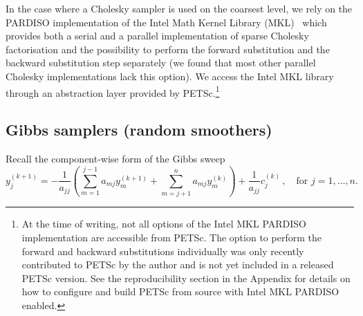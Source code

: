 \documentclass[
fontsize=11pt,
paper=a4,
numbers=noenddot
]{scrartcl}
\begin{document}
 In the case where a Cholesky sampler is used on the coarsest level, we rely on the PARDISO implementation of the Intel Math Kernel Library (MKL)~\cite{intelmkl} which provides both a serial and a parallel implementation of sparse Cholesky factorisation and the possibility to perform the forward substitution and the backward substitution step separately (we found that most other parallel Cholesky implementations lack this option). We access the Intel MKL library through an abstraction layer provided by PETSc.\footnote{At the time of writing, not all options of the Intel MKL PARDISO implementation are accessible from PETSc. The option to perform the forward and backward substitutions individually was only recently contributed to PETSc by the author and is not yet included in a released PETSc version. See the reproducibility section in the Appendix for details on how to configure and build PETSc from source with Intel MKL PARDISO enabled.} 

\subsection{Gibbs samplers (random smoothers)}

Recall the component-wise form of the Gibbs sweep
\begin{equation*}
    y^{(k+1)}_j = - \frac{1}{a_{jj}} \left(
        \sum_{m=1}^{j-1} a_{mj} y^{(k+1)}_m + \sum_{m=j+1}^n a_{mj} y^{(k)}_m
    \right) + \frac{1}{a_{jj}} c^{(k)}_j \,,\quad \text{for $j=1,\dotsc,n$.}
\end{equation*}
\end{document}
